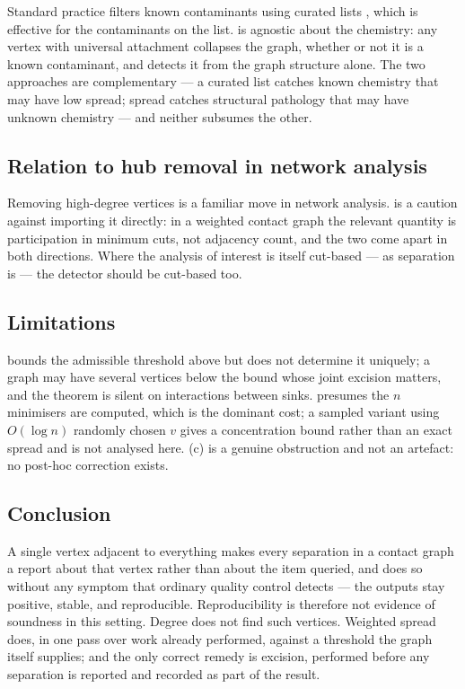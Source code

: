 \documentclass[11pt,a4paper]{article}
\theoremstyle{definition}
\theoremstyle{remark}
\begin{document}
Standard practice filters known contaminants using curated lists
\citep{cox2008maxquant}, which is effective for the contaminants on the
list.  is agnostic about the chemistry: any vertex
with universal attachment collapses the graph, whether or not it is a
known contaminant, and  detects it from the graph
structure alone. The two approaches are complementary --- a curated list
catches known chemistry that may have low spread; spread catches
structural pathology that may have unknown chemistry --- and neither
subsumes the other.

\subsection{Relation to hub removal in network analysis}

Removing high-degree vertices is a familiar move in network analysis.
 is a caution against importing it directly: in a
weighted contact graph the relevant quantity is participation in minimum
cuts, not adjacency count, and the two come apart in both directions.
Where the analysis of interest is itself cut-based --- as separation is
--- the detector should be cut-based too.

\subsection{Limitations}

 bounds the admissible threshold above but does not
determine it uniquely; a graph may have several vertices below the bound
whose joint excision matters, and the theorem is silent on interactions
between sinks.  presumes the $n$ minimisers are
computed, which is the dominant cost; a sampled variant using $O(\log n)$
randomly chosen $v$ gives a concentration bound rather than an exact
spread and is not analysed here. (c) is a genuine
obstruction and not an artefact: no post-hoc correction exists.

\subsection{Conclusion}

A single vertex adjacent to everything makes every separation in a
contact graph a report about that vertex rather than about the item
queried, and does so without any symptom that ordinary quality control
detects --- the outputs stay positive, stable, and reproducible.
Reproducibility is therefore not evidence of soundness in this setting.
Degree does not find such vertices. Weighted spread does, in one pass
over work already performed, against a threshold the graph itself
supplies; and the only correct remedy is excision, performed before any
separation is reported and recorded as part of the result.



\end{document}
